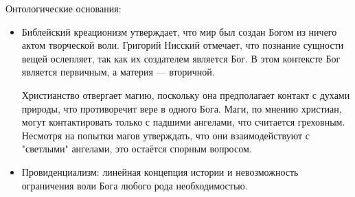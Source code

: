 
Онтологические основания:
\begin{itemize}
\item Библейский креационизм утверждает, что мир был создан Богом из ничего актом творческой воли. Григорий Нисский отмечает, что познание сущности вещей ослепляет, так как их создателем является Бог. В этом контексте Бог является первичным, а материя — вторичной.

Христианство отвергает магию, поскольку она предполагает контакт с духами природы, что противоречит вере в одного Бога. Маги, по мнению христиан, могут контактировать только с падшими ангелами, что считается греховным. Несмотря на попытки магов утверждать, что они взаимодействуют с "светлыми" ангелами, это остаётся спорным вопросом.

\item Провиденциализм: линейная концепция истории и невозможность ограничения воли Бога любого рода необходимостью.
\end{itemize}

